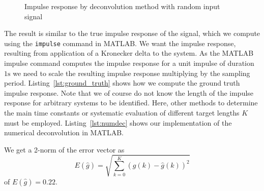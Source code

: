\documentclass{scrartcl}
\newcommand*{\matlabcode}[3]{\begin{figure}[h!]\end{figure}}
\begin{document}
\begin{figure}[h]
\begin{subfigure}{.49\textwidth}
		\label{fig:impulseresponse}
	\end{subfigure}
	\caption{Impulse response by deconvolution method with random input signal}\label{fig:deconvolution}
\end{figure}

The result is similar to the true impulse response of the signal, which we compute using the \verb|impulse| command in MATLAB.
We want the impulse response, resulting from application of a Kronecker delta to the system. 
As the MATLAB impulse command computes the impulse response for a unit impulse of duration $1\si{\second}$ we need to scale the resulting impulse response multiplying by the sampling period. Listing~\ref{lst:ground_truth} shows how we compute the ground truth impulse response.
Note that we of course do not know the length of the impulse response for arbitrary systems to be identified. 
Here, other methods to determine the main time constants or systematic evaluation of different target lengths $K$ must be employed.
Listing~\ref{lst:numdec} shows our implementation of the numerical deconvolution in MATLAB.
\matlabcode{../matlab/ce1/ground_truth_imp_resp.m}{Computation of the ground truth impulse response.}{lst:ground_truth}
\matlabcode{../matlab/ce1/estimate_impulse_response_numdec.m}{Estimator of the impulse response via numerical deconvolution in MATLAB.}{lst:numdec}

\noindent We get a 2-norm of the error vector as
\begin{equation}\label{eq:2-norm}
	E(\hat{g}) = \sqrt{\sum\limits_{k=0}^K \left(g(k) - \hat{g}(k)\right)^2}
\end{equation}
of $E(\hat{g}) = 0.22$.

\clearpage
\newpage
\end{document}
